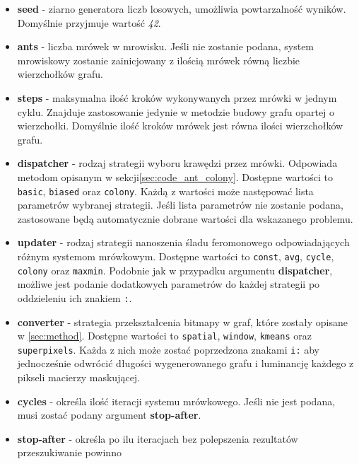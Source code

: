 {{{            \begin{itemize}
                \item \textbf{seed} - ziarno generatora liczb losowych, umożliwia powtarzalność wyników. Domyślnie
                przyjmuje wartość \textit{42}.
                \item \textbf{ants} - liczba mrówek w mrowisku. Jeśli nie zostanie podana, system mrowiskowy zostanie
                zainicjowany z ilością mrówek równą liczbie wierzchołków grafu.
                \item \textbf{steps} - maksymalna ilość kroków wykonywanych przez mrówki w jednym cyklu. Znajduje
                zastosowanie jedynie w metodzie budowy grafu opartej o wierzchołki. Domyślnie ilość kroków mrówek jest
                równa ilości wierzchołków grafu.
                \item \textbf{dispatcher} - rodzaj strategii wyboru krawędzi przez mrówki. Odpowiada metodom opisanym w
                sekcji\ref{sec:code_ant_colony}. Dostępne wartości to \lstinline{basic}, \lstinline{biased} oraz
                \lstinline{colony}. Każdą z wartości może następować lista parametrów wybranej strategii. Jeśli lista
                parametrów nie zostanie podana, zastosowane będą automatycznie dobrane wartości dla wskazanego problemu.
                \item \textbf{updater} - rodzaj strategii nanoszenia śladu feromonowego odpowiadających różnym systemom
                mrówkowym. Dostępne wartości to \lstinline{const}, \lstinline{avg}, \lstinline{cycle},
                \lstinline{colony} oraz \lstinline{maxmin}. Podobnie jak w przypadku argumentu \textbf{dispatcher},
                możliwe jest podanie dodatkowych parametrów do każdej strategii po oddzieleniu ich znakiem
                \lstinline{:}.
                \item \textbf{converter} - strategia przekształcenia bitmapy w graf, które zostały opisane w
                \ref{sec:method}. Dostępne wartości to \lstinline{spatial}, \lstinline{window}, \lstinline{kmeans} oraz
                \lstinline{superpixels}. Każda z nich może zostać poprzedzona znakami \lstinline{i:} aby jednocześnie
                odwrócić długości wygenerowanego grafu i luminancję każdego z pikseli macierzy maskującej.
                \item \textbf{cycles} - określa ilość iteracji systemu mrówkowego. Jeśli nie jest podana, musi zostać
                podany argument \textbf{stop-after}.
                \item \textbf{stop-after} - określa po ilu iteracjach bez polepszenia rezultatów przeszukiwanie powinno

\end{itemize}}}}
